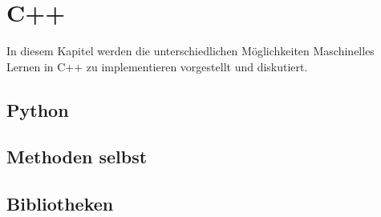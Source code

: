 \section{C++}
In diesem Kapitel werden die unterschiedlichen Möglichkeiten Maschinelles Lernen in C++ zu implementieren vorgestellt und diskutiert.
\subsection{Python}
\subsection{Methoden selbst}
\subsection{Bibliotheken}